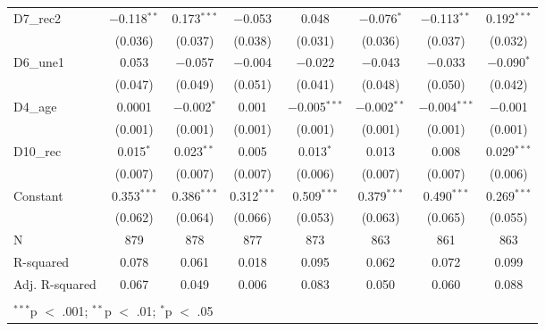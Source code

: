 \documentclass[
]{article}
\begin{document}
\begin{table}[!htbp]
\begin{tabular}{@{\extracolsep{5pt}}lccccccc}
  D7\_rec2 & $-$0.118$^{**}$ & 0.173$^{***}$ & $-$0.053 & 0.048 & $-$0.076$^{*}$ & $-$0.113$^{**}$ & 0.192$^{***}$ \\ 
  & (0.036) & (0.037) & (0.038) & (0.031) & (0.036) & (0.037) & (0.032) \\ 
  D6\_une1 & 0.053 & $-$0.057 & $-$0.004 & $-$0.022 & $-$0.043 & $-$0.033 & $-$0.090$^{*}$ \\ 
  & (0.047) & (0.049) & (0.051) & (0.041) & (0.048) & (0.050) & (0.042) \\ 
  D4\_age & 0.0001 & $-$0.002$^{*}$ & 0.001 & $-$0.005$^{***}$ & $-$0.002$^{**}$ & $-$0.004$^{***}$ & $-$0.001 \\ 
  & (0.001) & (0.001) & (0.001) & (0.001) & (0.001) & (0.001) & (0.001) \\ 
  D10\_rec & 0.015$^{*}$ & 0.023$^{**}$ & 0.005 & 0.013$^{*}$ & 0.013 & 0.008 & 0.029$^{***}$ \\ 
  & (0.007) & (0.007) & (0.007) & (0.006) & (0.007) & (0.007) & (0.006) \\ 
  Constant & 0.353$^{***}$ & 0.386$^{***}$ & 0.312$^{***}$ & 0.509$^{***}$ & 0.379$^{***}$ & 0.490$^{***}$ & 0.269$^{***}$ \\ 
  & (0.062) & (0.064) & (0.066) & (0.053) & (0.063) & (0.065) & (0.055) \\ 
 N & 879 & 878 & 877 & 873 & 863 & 861 & 863 \\ 
R-squared & 0.078 & 0.061 & 0.018 & 0.095 & 0.062 & 0.072 & 0.099 \\ 
Adj. R-squared & 0.067 & 0.049 & 0.006 & 0.083 & 0.050 & 0.060 & 0.088 \\ 
\hline \\[-1.8ex] 
\multicolumn{8}{l}{$^{***}$p $<$ .001; $^{**}$p $<$ .01; $^{*}$p $<$ .05} \\ 
\end{tabular} 
\end{table}
\end{document}

